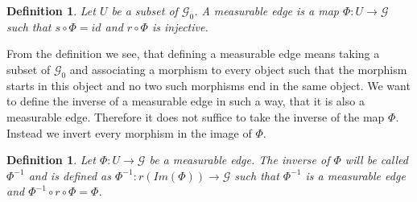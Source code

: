 \documentclass[12pt,a4paper]{scrartcl}
\newtheorem{Definition}[Theorem]{Definition}
\numberwithin{equation}{section}
\newcommand{\2}{\mathbb{Z} / 2 \mathbb{Z}}
\newcommand{\G}{\mathcal{G}}
\newcommand{\1}{\overline{1}}
\newcommand{\0}{\overline{0}}
\begin{document}
\begin{Definition}
	Let $U$ be a subset of $\G_0$. A measurable edge is a map $\Phi:U \to \G$ such that $s \circ \Phi = id$ and $r \circ \Phi$ is injective.
\end{Definition}
From the definition we see, that defining a measurable edge means taking a subset of $\G_0$ and associating a morphism to every object such that the morphism starts in this object and no two such morphisms end in the same object. We want to define the inverse of a measurable edge in such a way, that it is also a measurable edge. Therefore it does not suffice to take the inverse of the map $\Phi$. Instead we invert every morphism in the image of $\Phi$.
\begin{Definition}
	Let $\Phi: U \to \G$ be a measurable edge. The inverse of $\Phi$ will be called $\Phi^{-1}$ and is defined as $\Phi^{-1}:r(Im(\Phi)) \to \G$ such that $\Phi^{-1}$ is a measurable edge and $\Phi^{-1} \circ r \circ \Phi = \Phi$.
\end{Definition}
\end{document}

